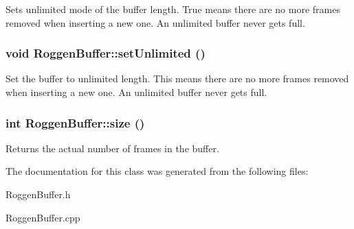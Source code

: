 \label{classRoggenBuffer_a3c0a581a4b554b63ad6ed8a1ee8c4d19}
Sets unlimited mode of the buffer length. True means there are no more frames removed when inserting a new one. An unlimited buffer never gets full. \hypertarget{classRoggenBuffer_a86fe403735010ca3d62dbde7de22c0f3}{
\subsubsection[{setUnlimited}]{\setlength{\rightskip}{0pt plus 5cm}void RoggenBuffer::setUnlimited ()}}
\label{classRoggenBuffer_a86fe403735010ca3d62dbde7de22c0f3}
Set the buffer to unlimited length. This means there are no more frames removed when inserting a new one. An unlimited buffer never gets full. \hypertarget{classRoggenBuffer_aa74b37a710412767fa3bfcbf7f7c1958}{
\subsubsection[{size}]{\setlength{\rightskip}{0pt plus 5cm}int RoggenBuffer::size ()}}
\label{classRoggenBuffer_aa74b37a710412767fa3bfcbf7f7c1958}
Returns the actual number of frames in the buffer. 

The documentation for this class was generated from the following files:\begin{DoxyCompactItemize}
\item 
RoggenBuffer.h\item 
RoggenBuffer.cpp\end{DoxyCompactItemize}
